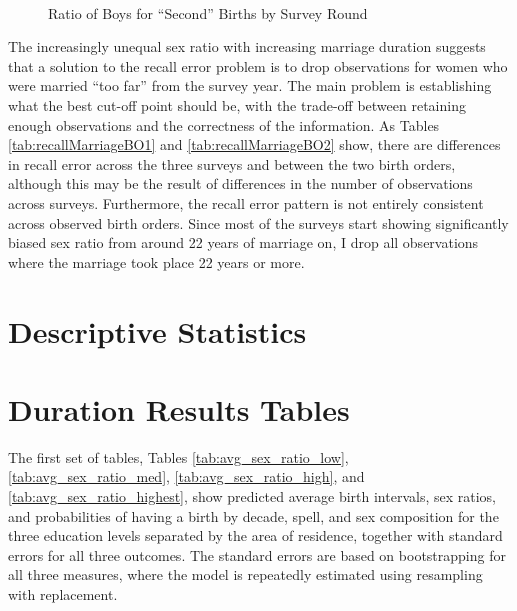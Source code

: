 \documentclass[12pt,letterpaper]{article}
\begin{document}
\begin{figure}
\centering
{}
 \\
\caption{Ratio of Boys for ``Second'' Births by Survey Round}
\label{fig:sex_ratio_recall_rounds_bo2}
\end{figure}


The increasingly unequal sex ratio with increasing marriage duration suggests that
a solution to the recall error problem is to drop observations for 
women who were married ``too far'' from the survey year.
The main problem is establishing what the best cut-off point should be, with the
trade-off between retaining enough observations and the correctness of the information.
As Tables \ref{tab:recallMarriageBO1} and \ref{tab:recallMarriageBO2} show, there are 
differences in recall error across the three surveys and between the two birth
orders, although this may be the result of differences in the number of observations 
across surveys.
Furthermore, the recall error pattern is not entirely consistent across observed birth 
orders.
Since most of the surveys start showing significantly biased sex ratio from around 22
years of marriage on, I drop all observations where the marriage took place 22 years
or more.


\clearpage
\newpage

\section{Descriptive Statistics}
\setcounter{figure}{0}
\setcounter{table}{0}




\clearpage
\newpage



\section{Duration Results Tables}

\setcounter{figure}{0}
\setcounter{table}{0}

The first set of tables, Tables \ref{tab:avg_sex_ratio_low}, \ref{tab:avg_sex_ratio_med}, 
\ref{tab:avg_sex_ratio_high}, and \ref{tab:avg_sex_ratio_highest}, show predicted average 
birth intervals, sex ratios, and 
probabilities of having a birth by decade, spell, and sex composition for the three 
education levels separated by the area of residence, together with standard errors for all 
three outcomes.
The standard errors are based on bootstrapping for all three measures,
where the model is repeatedly estimated using resampling with replacement.
\end{document}
